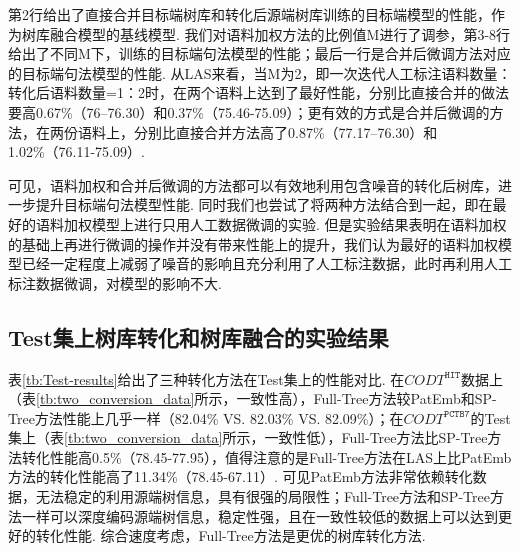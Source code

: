 第2行给出了直接合并目标端树库和转化后源端树库训练的目标端模型的性能，作为树库融合模型的基线模型. 我们对语料加权方法的比例值M进行了调参，第3-8行给出了不同M下，训练的目标端句法模型的性能；最后一行是合并后微调方法对应的目标端句法模型的性能. 从LAS来看，当M为2，即一次迭代人工标注语料数量：转化后语料数量=1：2时，在两个语料上达到了最好性能，分别比直接合并的做法要高0.67\%（76–76.30）和0.37\%（75.46-75.09）；更有效的方式是合并后微调的方法，在两份语料上，分别比直接合并方法高了0.87\%（77.17–76.30）和1.02\%（76.11-75.09）.

可见，语料加权和合并后微调的方法都可以有效地利用包含噪音的转化后树库，进一步提升目标端句法模型性能. 同时我们也尝试了将两种方法结合到一起，即在最好的语料加权模型上进行只用人工数据微调的实验. 但是实验结果表明在语料加权的基础上再进行微调的操作并没有带来性能上的提升，我们认为最好的语料加权模型已经一定程度上减弱了噪音的影响且充分利用了人工标注数据，此时再利用人工标注数据微调，对模型的影响不大.

\subsection{Test集上树库转化和树库融合的实验结果}
表\ref{tb:Test-results}给出了三种转化方法在Test集上的性能对比. 在$CODT^{\texttt{HIT}}$数据上（表\ref{tb:two_conversion_data}所示，一致性高），Full-Tree方法较PatEmb和SP-Tree方法性能上几乎一样（82.04\% VS. 82.03\% VS. 82.09\%）；在$CODT^{\texttt{PCTB7}}$的Test集上（表\ref{tb:two_conversion_data}所示，一致性低），Full-Tree方法比SP-Tree方法转化性能高0.5\%（78.45-77.95），值得注意的是Full-Tree方法在LAS上比PatEmb方法的转化性能高了11.34\%（78.45-67.11）. 可见PatEmb方法非常依赖转化数据，无法稳定的利用源端树信息，具有很强的局限性；Full-Tree方法和SP-Tree方法一样可以深度编码源端树信息，稳定性强，且在一致性较低的数据上可以达到更好的转化性能. 综合速度考虑，Full-Tree方法是更优的树库转化方法.

